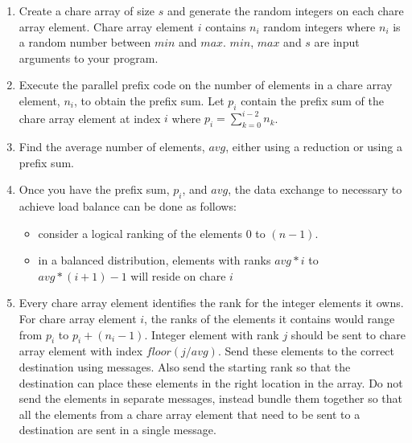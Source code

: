 \documentclass{article}
\begin{document}
\begin{enumerate}

\item Create a chare array of size $s$ and generate the random integers on
each chare array element. Chare array element $i$ contains $n_i$ random integers
where $n_i$ is a random number between $min$ and $max$. $min$,
$max$ and $s$ are input arguments to your program.

\item Execute the parallel prefix code on the number of elements in a chare array
element, $n_i$, to obtain the prefix sum. Let $p_i$ contain the prefix sum of the
chare array element at index $i$ where $p_i = \sum\limits_{k=0}^{i-2} n_k$.

\item Find the average number of elements, $avg$, either using a reduction or using a prefix sum.

\item Once you have the prefix sum, $p_i$, and $avg$, the data exchange to necessary to achieve load
balance can be done as follows:
\begin{itemize}
\item consider a logical ranking of the elements $0$ to $(n-1)$.
\item in a balanced distribution, elements with ranks $avg*i$ to $avg*(i +1)-1$ will reside on chare $i$
\end{itemize}


\item Every chare array element identifies the rank for the integer elements it
owns. For chare array element $i$, the ranks of the elements it contains would
range from $p_i$ to $p_i + (n_i - 1)$. Integer element with rank $j$ should be
sent to chare array element with index $floor(j/avg)$. Send these elements to
the correct destination using messages. Also send the starting rank so that the
destination can place these elements in the right location in the array. Do not
send the elements in separate messages, instead bundle them together so that
all the elements from a chare array element that need to be sent to a
destination are sent in a single message.


\end{enumerate}
\end{document}
